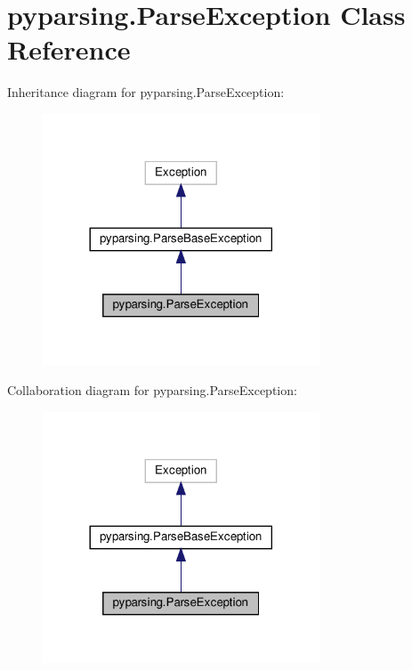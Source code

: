 \hypertarget{classpyparsing_1_1ParseException}{}\section{pyparsing.\+Parse\+Exception Class Reference}
\label{classpyparsing_1_1ParseException}


Inheritance diagram for pyparsing.\+Parse\+Exception\+:
\nopagebreak
\begin{figure}[H]
\begin{center}
\leavevmode
\includegraphics[width=233pt]{classpyparsing_1_1ParseException__inherit__graph}
\end{center}
\end{figure}


Collaboration diagram for pyparsing.\+Parse\+Exception\+:
\nopagebreak
\begin{figure}[H]
\begin{center}
\leavevmode
\includegraphics[width=233pt]{classpyparsing_1_1ParseException__coll__graph}
\end{center}
\end{figure}
